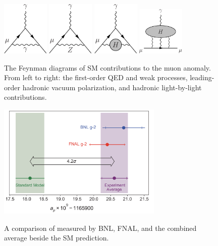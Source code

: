\begin{figure}[H]
    \centering
    {\includegraphics[width=0.2\textwidth]{Images/Theory/Muon_gminus2_photon.pdf}\hspace{0.05\textwidth}}
    {\includegraphics[width=0.2\textwidth]{Images/Theory/Muon_gminus2_Z.pdf}\hspace{0.05\textwidth}}
    {\includegraphics[width=0.2\textwidth]{Images/Theory/Muon_gminus2_Hadronic.pdf}\hspace{0.05\textwidth}}
    {\includegraphics[width=0.2\textwidth]{Images/Theory/Muon_gminus2_Hadronic2.pdf}}
    \caption{The Feynman diagrams of SM contributions to the muon anomaly. From left to right: the first-order QED and weak processes, leading-order hadronic vacuum polarization, and hadronic light-by-light contributions.}
    \label{fig:amu}
\end{figure}

\begin{figure}[H]
    \centering
    {\includegraphics[width=0.7\textwidth]{Images/Theory/MuonAnomaly.png}}
    \caption{A comparison of \amuon measured by BNL, FNAL, and the combined average beside the SM prediction.}
    \label{fig:amuExp}
\end{figure}

